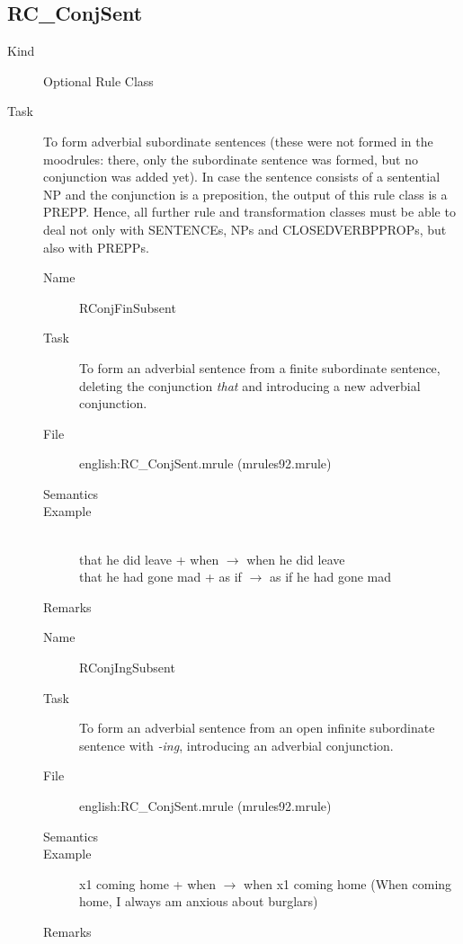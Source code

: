 \newpage
\subsection{RC\_ConjSent}
\begin{description}
\item[Kind] Optional Rule Class
\item[Task] To form adverbial subordinate sentences (these were not formed in 
the mood\-rules: there, 
only the subordinate sentence was formed, but no conjunction 
was added yet). In case the sentence consists of a sentential NP and the 
conjunction is a preposition, the output of this rule class is a PREPP. Hence, 
all further rule and transformation classes must be able to deal not only with 
SENTENCEs, NPs and CLOSEDVERBPPROPs, but also with PREPPs.

\vspace{1 cm}
\begin{description}
\item[Name] RConjFinSubsent
\item[Task] To form an adverbial sentence from a finite subordinate sentence, 
deleting the conjunction {\em that\/} and introducing a new adverbial 
conjunction.
\item[File] english:RC\_ConjSent.mrule (mrules92.mrule)
\item[Semantics]
\item[Example] \mbox{}\\
that he did leave + when $\rightarrow$ when he did leave\\
 that he had gone mad + as if $\rightarrow$ as if he had gone mad
\item[Remarks]
\end{description}

\vspace{1 cm}
\begin{description}
\item[Name] RConjIngSubsent
\item[Task] To form an adverbial sentence from an open infinite subordinate 
sentence with {\em -ing\/}, introducing an adverbial conjunction.
\item[File] english:RC\_ConjSent.mrule (mrules92.mrule)
\item[Semantics]
\item[Example] x1 coming home + when $\rightarrow$ when x1 coming home (When 
coming home, I always am anxious about burglars)
\item[Remarks]
\end{description}


\end{description}
